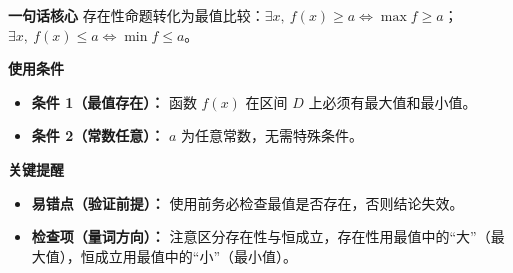 \begin{summarybox}
	\textbf{\textcolor{CSummary}{一句话核心}}
	存在性命题转化为最值比较：$\exists x,\ f(x)\ge a \iff \max f\ge a$；$\exists x,\ f(x)\le a \iff \min f\le a$。

	\medskip
	\textbf{\textcolor{CSummary}{使用条件}}
	\begin{itemize}[leftmargin=*, itemsep=0.5em, topsep=0.4em]
		\item \textbf{条件 1（最值存在）：} 函数 $f(x)$ 在区间 $D$ 上必须有最大值和最小值。
		\item \textbf{条件 2（常数任意）：} $a$ 为任意常数，无需特殊条件。
	\end{itemize}

	\medskip
	\textbf{\textcolor{CSummary}{关键提醒}}
	\begin{itemize}[leftmargin=*, itemsep=0.5em, topsep=0.4em]
		\item \textbf{易错点（验证前提）：} 使用前务必检查最值是否存在，否则结论失效。
		\item \textbf{检查项（量词方向）：} 注意区分存在性与恒成立，存在性用最值中的“大”（最大值），恒成立用最值中的“小”（最小值）。
	\end{itemize}

\end{summarybox}
